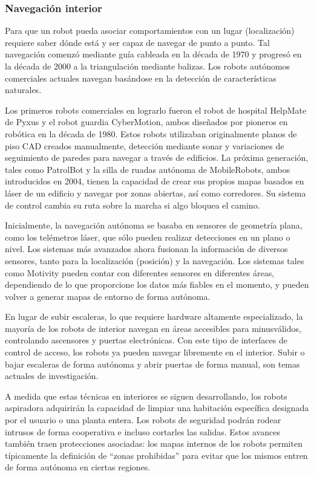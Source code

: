 \subsubsection{Navegación interior}
Para que un robot pueda asociar comportamientos con un lugar (localización) requiere saber dónde está y ser capaz de navegar de punto a punto. Tal navegación comenzó mediante guía cableada en la década de 1970 y progresó en la década de 2000 a la triangulación mediante balizas. Los robots autónomos comerciales actuales navegan basándose en la detección de características naturales.

Los primeros robots comerciales en lograrlo fueron el robot de hospital HelpMate de Pyxus y el robot guardia CyberMotion, ambos diseñados por pioneros en robótica en la década de 1980. Estos robots utilizaban originalmente planos de piso CAD creados manualmente, detección mediante sonar y variaciones de seguimiento de paredes para navegar a través de edificios. La próxima generación, tales como PatrolBot y la silla de ruadas autónoma de MobileRobots, ambos introducidos en 2004, tienen la capacidad de crear sus propios mapas basados en láser de un edificio y navegar por zonas abiertas, así como corredores. Su sistema de control cambia su ruta sobre la marcha si algo bloquea el camino.

Inicialmente, la navegación autónoma se basaba en sensores de geometría plana, como los telémetros láser, que sólo pueden realizar detecciones en un plano o nivel. Los sistemas más avanzados ahora fusionan la información de diversos sensores, tanto para la localización (posición) y la navegación. Los sistemas tales como Motivity pueden contar con diferentes sensores en diferentes áreas, dependiendo de lo que proporcione los datos más fiables en el momento, y pueden volver a generar mapas de entorno de forma autónoma.

En lugar de subir escaleras, lo que requiere hardware altamente especializado, la mayoría de los robots de interior navegan en áreas accesibles para minusválidos, controlando ascensores y puertas electrónicas. Con este tipo de interfaces de control de acceso, los robots ya pueden navegar libremente en el interior. Subir o bajar escaleras de forma autónoma y abrir puertas de forma manual, son temas actuales de investigación.

A medida que estas técnicas en interiores se siguen desarrollando, los robots aspiradora adquirirán la capacidad de limpiar una habitación específica designada por el usuario o una planta entera. Los robots de seguridad podrán rodear intrusos de forma cooperativa e incluso cortarles las salidas. Estos avances también traen protecciones asociadas: los mapas internos de los robots permiten típicamente la definición de ``zonas prohibidas'' para evitar que los mismos entren de forma autónoma en ciertas regiones.

